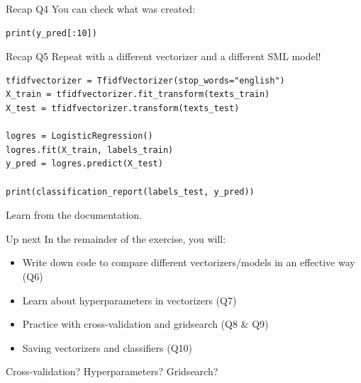 \documentclass[handout]{beamer}
\begin{document}
\begin{frame}[fragile]{Recap Q4}
You can check what was created:
\begin{lstlisting}
print(y_pred[:10])
\end{lstlisting}

\begin{lstlistingoutput}
\end{lstlistingoutput}
\end{frame}



\begin{frame}[fragile]{Recap Q5}
Repeat with a different vectorizer and a different SML model!
\begin{lstlisting}
tfidfvectorizer = TfidfVectorizer(stop_words="english")
X_train = tfidfvectorizer.fit_transform(texts_train)
X_test = tfidfvectorizer.transform(texts_test)

logres = LogisticRegression()
logres.fit(X_train, labels_train)
y_pred = logres.predict(X_test)

print(classification_report(labels_test, y_pred))
\end{lstlisting}

Learn from the documentation.
\end{frame}


\begin{frame}{Up next}
In the remainder of the exercise, you will:
\begin{itemize}
\item Write down code to compare different vectorizers/models in an effective way (Q6)
		\item Learn about hyperparameters in vectorizers (Q7)
		\item Practice with cross-validation and gridsearch (Q8 \& Q9)
		\item Saving vectorizers and classifiers (Q10) 
\end{itemize}

Cross-validation? Hyperparameters? Gridsearch?
\end{frame}



	
	
\end{document}
